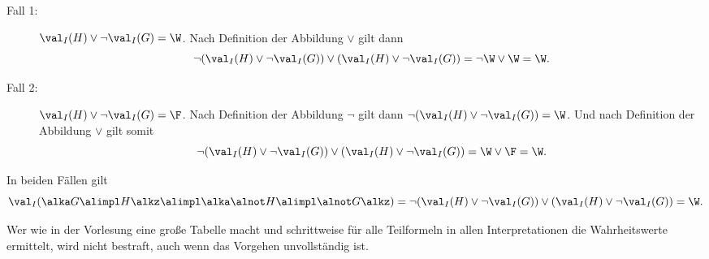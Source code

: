 \documentclass[12pt]{article}
\begin{document}
\begin{loesung}
\begin{equation*}
  \end{equation*}
  \begin{description}
    \item[Fall 1:] $\val_I(H) \lor \lnot \val_I(G) = \W$. Nach Definition der Abbildung
          $\lor$ gilt dann
          \begin{equation*}
            \lnot (\val_I(H) \lor \lnot \val_I(G)) \lor (\val_I(H) \lor \lnot \val_I(G))
            = \lnot \W \lor \W
            = \W.
          \end{equation*}
    \item[Fall 2:] $\val_I(H) \lor \lnot \val_I(G) = \F$. Nach Definition der Abbildung
          $\lnot$ gilt dann $\lnot (\val_I(H) \lor \lnot \val_I(G)) = \W$. Und nach
          Definition der Abbildung $\lor$ gilt somit
          \begin{equation*}
            \lnot (\val_I(H) \lor \lnot \val_I(G)) \lor (\val_I(H) \lor \lnot \val_I(G))
            = \W \lor \F
            = \W.
          \end{equation*}
  \end{description}
  In beiden Fällen gilt
  \begin{equation*}
    \val_I(\alka G\alimpl H\alkz \alimpl \alka \alnot H \alimpl\alnot G\alkz)
    = \lnot (\val_I(H) \lor \lnot \val_I(G)) \lor (\val_I(H) \lor \lnot \val_I(G))
    = \W.
  \end{equation*}

  \begin{korrektur}
    Wer wie in der Vorlesung eine große Tabelle macht und schrittweise
    für alle Teilformeln in allen Interpretationen die Wahrheitswerte
    ermittelt, wird nicht bestraft, auch wenn das Vorgehen
    unvollständig ist.
  \end{korrektur}

\end{loesung}
\end{document}
